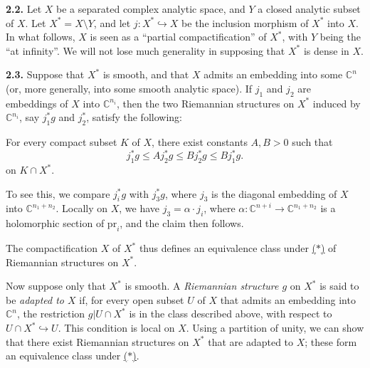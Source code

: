 \documentclass{report}
\newenvironment{itenv*}
  {\phantomsection\par\medskip\noindent\itshape}
  {\par\medskip}
\newenvironment{rmenv}[1]
  {\phantomsection\par\medskip\noindent\textbf{#1.}\rmfamily}
  {\par\medskip}
\newcommand{\CC}{\mathbb{C}}
\newcommand{\pr}{\mathrm{pr}}
\renewcommand{\leq}{\leqslant}
\newcommand{\oldpage}[1]{\marginpar{\footnotesize$\Big\vert$ \textit{p.~#1}}}
\begin{document}
\oldpage{61}
\begin{rmenv}{2.2}
\label{II.2.2}
  Let $X$ be a separated complex analytic space, and $Y$ a closed analytic subset of $X$.
  Let $X^*=X\setminus Y$, and let $j\colon X^*\hookrightarrow X$ be the inclusion morphism of $X^*$ into $X$.
  In what follows, $X$ is seen as a ``partial compactification'' of $X^*$, with $Y$ being the ``at infinity''.
  We will not lose much generality in supposing that $X^*$ is dense in $X$.
\end{rmenv}

\begin{rmenv}{2.3}
\label{II.2.3}
  Suppose that $X^*$ is smooth, and that $X$ admits an embedding into some $\CC^n$ (or, more generally, into some smooth analytic space).
  If $j_1$ and $j_2$ are embeddings of $X$ into $\CC^{n_i}$, then the two Riemannian structures on $X^*$ induced by $\CC^{n_i}$, say $j_1^*g$ and $j_2^*$, satisfy the following:

  \begin{itenv*}
  \label{II.2.3.*}
    For every compact subset $K$ of $X$, there exist constants $A,B>0$ such that
    \[
      j_1^*g \leq Aj_2^*g \leq Bj_2^*g \leq Bj_1^*g.
    \tag{$*$}
    \]
    on $K\cap X^*$.
  \end{itenv*}

  To see this, we compare $j_i^*g$ with $j_3^*g$, where $j_3$ is the diagonal embedding of $X$ into $\CC^{n_1+n_2}$.
  Locally on $X$, we have $j_3=\alpha\cdot j_i$, where $\alpha\colon\CC^{n+i}\to\CC^{n_1+n_2}$ is a holomorphic section of $\pr_i$, and the claim then follows.

  The compactification $X$ of $X^*$ thus defines an equivalence class under \hyperref[II.2.3.*]{($*$)} of Riemannian structures on $X^*$.

  Now suppose only that $X^*$ is smooth.
  A \emph{Riemannian structure $g$} on $X^*$ is said to be \emph{adapted to $X$} if, for every open subset $U$ of $X$ that admits an embedding into $\CC^n$, the restriction $g|U\cap X^*$ is in the class described above, with respect to $U\cap X^*\hookrightarrow U$.
  This condition is local on $X$.
  Using a partition of unity, we can show that there exist Riemannian structures on $X^*$ that are adapted to $X$;
  these form an equivalence class under \hyperref[II.2.3.*]{($*$)}.
\end{rmenv}
\end{document}
